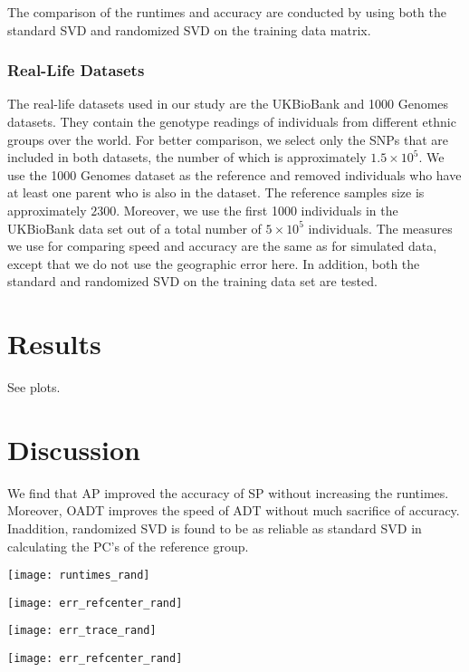 \documentclass{article}
\begin{document}
The comparison of the runtimes and accuracy are conducted by using both the
standard SVD and randomized SVD on the training data matrix.

\subsubsection{Real-Life Datasets}

The real-life datasets used in our study are the UKBioBank and 1000 Genomes datasets.
They contain the genotype readings of individuals from different ethnic groups over the world.
For better comparison, we select only the SNPs that are included in both datasets,
the number of which is approximately $1.5 \times 10^5$.
We use the 1000 Genomes dataset as the reference and removed individuals who have at least one parent who is also in the dataset.
The reference samples size is approximately $2300$.
Moreover, we use the first 1000 individuals in the UKBioBank data set out of a
total number of $5 \times 10^5$ individuals. 
The measures we use for comparing speed and accuracy are the same as for
simulated data,
except that we do not use the geographic error here.
In addition, both the standard and randomized SVD on the training data set are tested.



\section{Results}

See plots.



\section{Discussion}

We find that AP improved the accuracy of SP without increasing the runtimes.
Moreover, OADT improves the speed of ADT without much sacrifice of accuracy.
Inaddition, randomized SVD is found to be as reliable as standard SVD in
calculating the PC's of the reference group.

\newpage

\texttt{[image: runtimes\_rand]}

\texttt{[image: err\_refcenter\_rand]}

\texttt{[image: err\_trace\_rand]}

\texttt{[image: err\_refcenter\_rand]}
\end{document}
